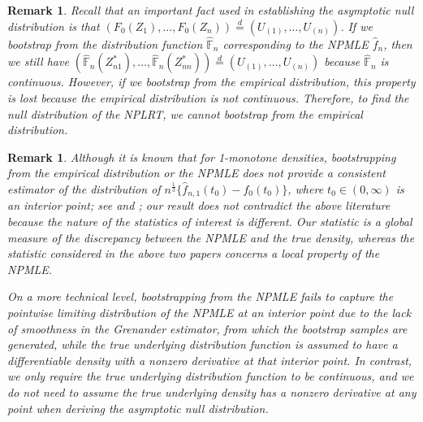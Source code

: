 \documentclass[12pt,letterpaper, twoside, openany]{article}
\theoremstyle{plain}
\newtheorem{remark}[theorem]{Remark}
\begin{document}
		\begin{remark}
			Recall that an important fact used in establishing the asymptotic null distribution is that $(F_0(Z_1),\ldots,F_0(Z_n)) \stackrel{d}{=} (U_{(1)},\ldots,U_{(n)})$.  If we bootstrap from the distribution function $\hat{\mathbb{F}}_n$ corresponding to the NPMLE $\hat{f}_n$, then we still have		$(\hat{\mathbb{F}}_n(Z^*_{n1}),\ldots,\hat{\mathbb{F}}_n(Z^*_{nn})) \stackrel{d}{=} (U_{(1)},\ldots,U_{(n)})$ because $\hat{\mathbb{F}}_n$ is continuous. However, if we bootstrap from the empirical distribution, this property is lost because the empirical distribution is not continuous.  Therefore, to find the null distribution of the NPLRT, we cannot bootstrap from the empirical distribution. 
		\end{remark}
		\begin{remark}
			Although it is known that for 1-monotone densities, bootstrapping from the empirical distribution or the NPMLE does not provide a consistent estimator of the distribution of $n^{\frac{1}{3}}\{\hat{f}_{n,1}(t_0) -f_0(t_0)\}$, where $t_0 \in (0, \infty)$ is an interior point; see \cite{kosorok2008bootstrapping} and \cite{sen2010inconsistency}; our result does not contradict the above literature because the nature of the statistics of interest is different. Our statistic is a global measure of the discrepancy between the NPMLE and the true density, whereas the statistic considered in the above two papers concerns a local property of the NPMLE. 
   
   On a more technical level, bootstrapping from the NPMLE fails to capture the pointwise limiting distribution of the NPMLE at an interior point due to the lack of smoothness in the Grenander estimator, from which the bootstrap samples are generated, while the true underlying distribution function is assumed to have a differentiable density with a nonzero derivative at that interior point.  In contrast, we only require the true underlying distribution function to be continuous, and we do not need to assume the true underlying density has a nonzero derivative at any point when deriving the asymptotic null distribution.
		\end{remark}
		
\end{document}
